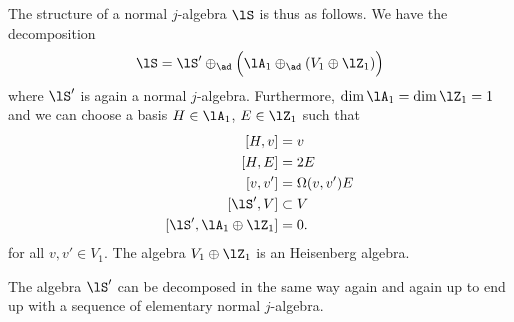 The structure of a normal $j$-algebra $\lS$ is thus as follows. We have the decomposition
\begin{equation}
    \lS=\lS'\oplus_{\ad}\Big( \lA_1\oplus_{\ad}(V_1\oplus\lZ_1) \Big)
\end{equation}
where $\lS'$ is again a normal $j$-algebra. Furthermore, $\dim\lA_1=\dim\lZ_1=1$ and we can choose a basis $H\in\lA_1$, $E\in\lZ_1$ such that
\begin{equation}
    \begin{aligned}[]
        [H,v]&=v\\
        [H,E]&=2E\\
        [v,v']&=\Omega(v,v')E\\
        [\lS',V]&\subset V\\
        [\lS',\lA_1\oplus\lZ_1]&=0.
    \end{aligned}
\end{equation}
for all $v,v'\in V_1$. The algebra $V_1\oplus\lZ_1$ is an Heisenberg algebra. 

The algebra $\lS'$ can be decomposed in the same way again and again up to end up with a sequence of elementary normal $j$-algebra.
